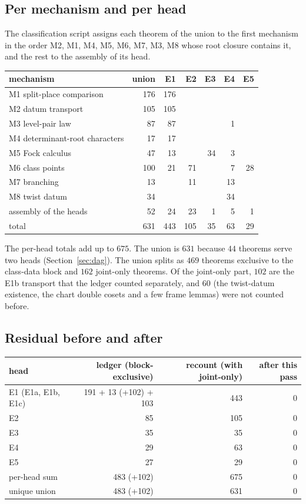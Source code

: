 \documentclass[11pt]{article}
\newcommand{\rr}{\raggedright\arraybackslash}
\theoremstyle{remark}
\begin{document}
\subsection{Per mechanism and per head}
The classification script  assigns each theorem of the union to the first mechanism in the order M2, M1, M4, M5, M6, M7, M3, M8 whose root closure contains it, and the rest to the assembly of its head.

\begin{center}\small
\begin{tabular}{lrrrrrr}
\toprule
mechanism & union & E1 & E2 & E3 & E4 & E5\\
\midrule
M1 split-place comparison & 176 & 176 & & & & \\
M2 datum transport & 105 & 105 & & & & \\
M3 level-pair law & 87 & 87 & & & 1 & \\
M4 determinant-root characters & 17 & 17 & & & & \\
M5 Fock calculus & 47 & 13 & & 34 & 3 & \\
M6 class points & 100 & 21 & 71 & & 7 & 28\\
M7 branching & 13 & & 11 & & 13 & \\
M8 twist datum & 34 & & & & 34 & \\
assembly of the heads & 52 & 24 & 23 & 1 & 5 & 1\\
\midrule
total & 631 & 443 & 105 & 35 & 63 & 29\\
\bottomrule
\end{tabular}
\end{center}

\noindent The per-head totals add up to $675$. The union is $631$ because $44$ theorems serve two heads (Section~\ref{sec:dag}). The union splits as $469$ theorems exclusive to the class-data block and $162$ joint-only theorems. Of the joint-only part, $102$ are the E1b transport that the ledger counted separately, and $60$ (the twist-datum existence, the chart double cosets and a few frame lemmas) were not counted before.

\subsection{Residual before and after}
\begin{center}\small
\begin{tabular}{>{\rr}p{3cm}rrr}
\toprule
head & ledger (block-exclusive) & recount (with joint-only) & after this pass\\
\midrule
E1 (E1a, E1b, E1c) & 191 + 13 (+102) + 103 & 443 & 0\\
E2 & 85 & 105 & 0\\
E3 & 35 & 35 & 0\\
E4 & 29 & 63 & 0\\
E5 & 27 & 29 & 0\\
\midrule
per-head sum & 483 (+102) & 675 & 0\\
unique union & 483 (+102) & 631 & 0\\
\bottomrule
\end{tabular}
\end{center}
\end{document}
